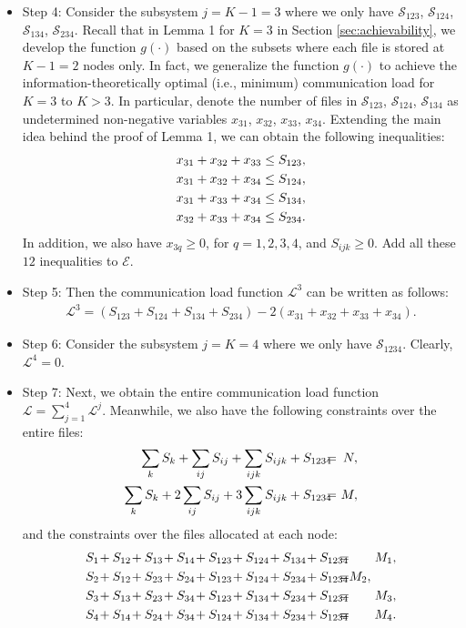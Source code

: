 \documentclass[conference]{IEEEtran}
\begin{document}
\begin{itemize}
\item{Step 4:} Consider the subsystem $j=K-1=3$ where we only have $\mathcal{S}_{123}$, $\mathcal{S}_{124}$, $\mathcal{S}_{134}$, $\mathcal{S}_{234}$. Recall that in Lemma 1 for $K=3$ in Section \ref{sec:achievability}, we develop the function $g(\cdot)$ based on the subsets where each file is stored at $K-1=2$ nodes only. In fact, we generalize the function $g(\cdot)$ to achieve the information-theoretically optimal (i.e., minimum) communication load for $K=3$ to $K>3$. In particular, denote the number of files in $\mathcal{S}_{123}$, $\mathcal{S}_{124}$, $\mathcal{S}_{134}$ as undetermined non-negative variables $x_{31}$, $x_{32}$, $x_{33}$, $x_{34}$. Extending the main idea behind the proof of Lemma 1, we can obtain the following inequalities:
\begin{eqnarray}
x_{31}+x_{32}+x_{33}\leq S_{123},\notag\\
x_{31}+x_{32}+x_{34}\leq S_{124},\\
x_{31}+x_{33}+x_{34}\leq S_{134},\notag\\
x_{32}+x_{33}+x_{34}\leq S_{234}.\notag
\end{eqnarray}
In addition, we also have $x_{3q}\geq 0$, for $q=1,2,3,4$, and $S_{ijk}\geq 0$. Add all these $12$ inequalities to $\mathcal{E}$.

\item{Step 5:} Then the communication load function $\mathcal{L}^3$ can be written as follows:
\begin{eqnarray*}
\mathcal{L}^3\!=\!(S_{123}\!+S_{124}\!+S_{134}\!+S_{234})\!-\!2(x_{31}\!+x_{32}\!+x_{33}\!+x_{34}).
\end{eqnarray*}

\item{Step 6:} Consider the subsystem $j=K=4$ where we only have $\mathcal{S}_{1234}$. Clearly, $\mathcal{L}^4=0$.

\item{Step 7:} Next, we obtain the entire communication load function $\mathcal{L}=\sum_{j=1}^4\mathcal{L}^j$. Meanwhile, we also have the following constraints over the entire files:
\begin{eqnarray}
\sum_kS_k+\sum_{ij}S_{ij}+\sum_{ijk}S_{ijk}+S_{1234}&\!\!\!\!=\!\!\!\!&N,\notag\\
\sum_kS_k+2\sum_{ij}S_{ij}+3\sum_{ijk}S_{ijk}+S_{1234}&\!\!\!\!=\!\!\!\!&M,
\end{eqnarray}
and the constraints over the files allocated at each node:
\begin{eqnarray}
S_1\!+S_{12}\!+S_{13}\!+S_{14}\!+S_{123}\!+S_{124}\!+S_{134}\!+S_{1234}\!\!&\!\!\!\!=\!\!\!\!&\!\!M_1,\notag\\
S_2\!+S_{12}\!+S_{23}\!+S_{24}\!+S_{123}\!+S_{124}\!+S_{234}\!+S_{1234}\!\!&\!\!\!\!=\!\!\!\!&\!\!M_2,\ \ \ \ \ \ \\
S_3\!+S_{13}\!+S_{23}\!+S_{34}\!+S_{123}\!+S_{134}\!+S_{234}\!+S_{1234}\!\!&\!\!\!\!=\!\!\!\!&\!\!M_3,\notag\\
S_4\!+S_{14}\!+S_{24}\!+S_{34}\!+S_{124}\!+S_{134}\!+S_{234}\!+S_{1234}\!\!&\!\!\!\!=\!\!\!\!&\!\!M_4.\notag
\end{eqnarray}


\end{itemize}
\end{document}
